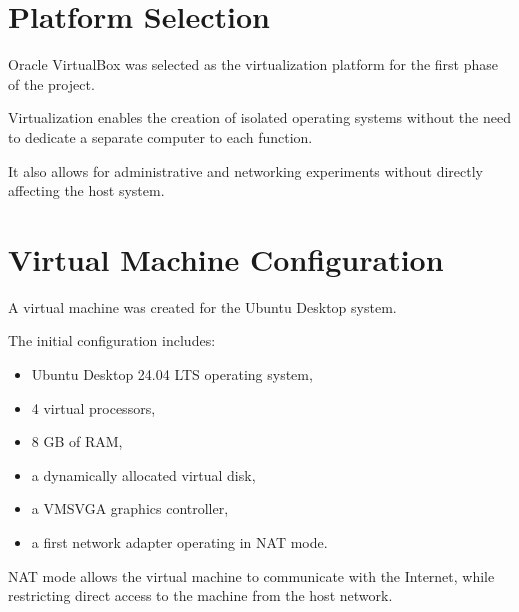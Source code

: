 \section{Platform Selection}

Oracle VirtualBox was selected as the virtualization platform
for the first phase of the project.

Virtualization enables the creation of isolated operating systems
without the need to dedicate a separate computer to each function.

It also allows for administrative
and networking experiments without directly affecting the host system.

\section {Virtual Machine Configuration}

A virtual machine was created for the Ubuntu Desktop system.

The initial configuration includes:

\begin{itemize}
    \item Ubuntu Desktop 24.04 LTS operating system,
    \item 4 virtual processors,
    \item 8 GB of RAM,
    \item a dynamically allocated virtual disk,
    \item a VMSVGA graphics controller,
    \item a first network adapter operating in NAT mode.
\end{itemize}

NAT mode allows the virtual machine to communicate with the Internet,
while restricting direct access to the machine from the host network.